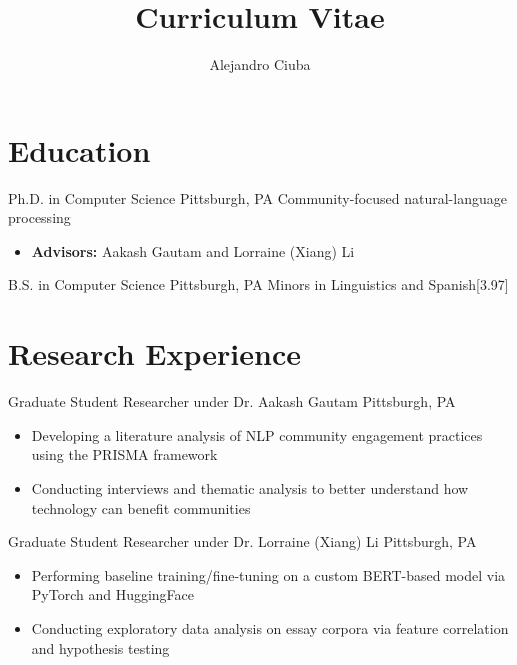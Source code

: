 \documentclass[11pt]{tianyicv}
\title{Curriculum Vitae}
\author{Alejandro Ciuba}
\begin{document}
\maketitle

\section{Education}

{Ph.D. in Computer Science}
{Pittsburgh, PA}{}
{Community-focused natural-language processing}{
    \begin{itemize}
        \item \textbf{Advisors:} Aakash Gautam and Lorraine (Xiang) Li 
    \end{itemize}
}

{B.S. in Computer Science}
{Pittsburgh, PA}{}
{Minors in Linguistics and Spanish}{}[3.97]


\section{Research Experience}

{Graduate Student Researcher under Dr. Aakash Gautam}
{Pittsburgh, PA}{}{
    \begin{itemize}
        \item Developing a literature analysis of NLP community engagement practices using the PRISMA framework
        \item Conducting interviews and thematic analysis to better understand how technology can benefit communities
    \end{itemize}
}

{Graduate Student Researcher under Dr. Lorraine (Xiang) Li}
{Pittsburgh, PA}{} {
    \begin{itemize}
        \item Performing baseline training/fine-tuning on a custom BERT-based model via PyTorch and HuggingFace 
        \item Conducting exploratory data analysis on essay corpora via feature correlation and hypothesis testing
    \end{itemize}
}
\end{document}
